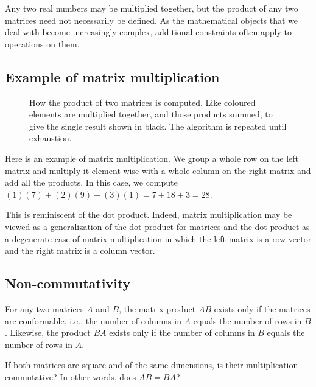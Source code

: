\documentclass[
  a4paper,
]{article}
\begin{document}
Any two real numbers may be multiplied together, but the product of any
two matrices need not necessarily be defined. As the mathematical
objects that we deal with become increasingly complex, additional
constraints often apply to operations on them.

\hypertarget{example-of-matrix-multiplication}{%
\subsection{Example of matrix
multiplication}\label{example-of-matrix-multiplication}}

\begin{figure}
\hypertarget{fig:matrixmult}{%
\centering

\caption{How the product of two matrices is computed. Like coloured
elements are multiplied together, and those products summed, to give the
single result shown in black. The algorithm is repeated until
exhaustion.}\label{fig:matrixmult}
}
\end{figure}

Here is an example of matrix multiplication. We group a whole row on the
left matrix and multiply it element-wise with a whole column on the
right matrix and add all the products. In this case, we compute
\((1)(7) + (2)(9) + (3)(1) = 7 + 18 + 3 = 28\).

This is reminiscent of the dot product. Indeed, matrix multiplication
may be viewed as a generalization of the dot product for matrices and
the dot product as a degenerate case of matrix multiplication in which
the left matrix is a row vector and the right matrix is a column vector.

\hypertarget{non-commutativity}{%
\subsection{Non-commutativity}\label{non-commutativity}}

For any two matrices \(A\) and \(B\), the matrix product \(AB\) exists
only if the matrices are conformable, i.e., the number of columns in
\(A\) equals the number of rows in \(B\). Likewise, the product \(BA\)
exists only if the number of columns in \(B\) equals the number of rows
in \(A\).

If both matrices are square and of the same dimensions, is their
multiplication commutative? In other words, does \(AB = BA\)?
\end{document}
